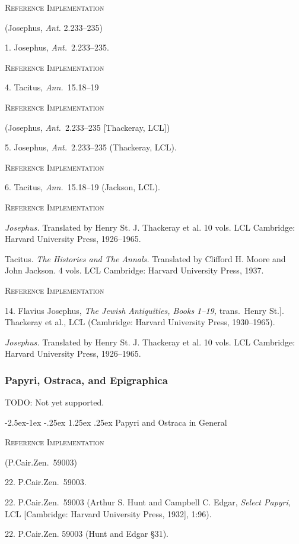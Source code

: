 \documentclass[a4paper]{article}
\makeatletter
\renewcommand\paragraph{\@startsection{paragraph}{4}{\z@}%
            {-2.5ex\@plus -1ex \@minus -.25ex}%
            {1.25ex \@plus .25ex}%
            {\normalfont\normalsize\bfseries}}
\newenvironment{refimp}{%
  \begin{minipage}{\linewidth}
    \setlength{\parskip}{1ex}
    \textsc{Reference Implementation}\par
    \nobreak
    \color{reference-colour}
}{\end{minipage}}
\makeatother
\begin{document}
\begin{refimp}
  (Josephus, \emph{Ant.} 2.233–235)

  1. Josephus, \emph{Ant.}\ 2.233–235.
\end{refimp}

\begin{refimp}
  4. Tacitus, \emph{Ann.}\ 15.18–19
\end{refimp}

\begin{refimp}
  (Josephus, \emph{Ant.}\ 2.233–235 [Thackeray, LCL])

  5. Josephus, \emph{Ant.}\ 2.233–235 (Thackeray, LCL).
\end{refimp}

\begin{refimp}
  6. Tacitus, \emph{Ann.}\ 15.18–19 (Jackson, LCL).
\end{refimp}

\begin{refimp}
  \hangindent\bibindent \emph{Josephus.} Translated by Henry St. J. Thackeray
  et al. 10 vols. LCL Cambridge: Harvard University Press, 1926–1965.

  \hangindent\bibindent Tacitus. \emph{The Histories and The Annals.}
  Translated by Clifford H. Moore and John Jackson. 4 vols. LCL Cambridge:
  Harvard University Press, 1937.
\end{refimp}

\begin{refimp}
  14. Flavius Josephus, \emph{The Jewish Antiquities, Books 1–19,} trans.\
  Henry St.]. Thackeray et al., LCL (Cambridge: Harvard University Press,
  1930–1965).

  \hangindent\bibindent \emph{Josephus.} Translated by Henry St. J. Thackeray
  et al. 10 vols. LCL Cambridge: Harvard University Press, 1926–1965.
\end{refimp}

\subsubsection{Papyri, Ostraca, and Epigraphica}

TODO: Not yet supported.

\paragraph{Papyri and Ostraca in General}

\begin{refimp}
  (P.Cair.Zen.\ 59003)

  22. P.Cair.Zen.\ 59003.

  22. P.Cair.Zen.\ 59003 (Arthur S. Hunt and Campbell C. Edgar, \emph{Select
  Papyri,} LCL [Cambridge: Harvard University Press, 1932], 1:96).

  22. P.Cair.Zen. 59003 (Hunt and Edgar §31).
\end{refimp}
\end{document}
